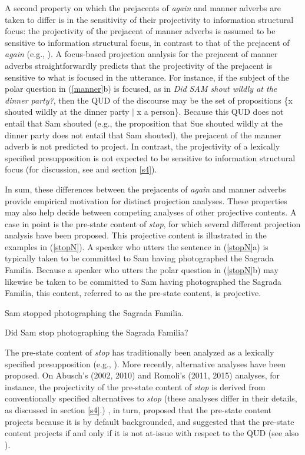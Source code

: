 \documentclass[a4paper,12pt]{article}
\newcommand{\6}{\mbox{$[\hspace*{-.6mm}[$}}
\newcommand{\9}{\mbox{$]\hspace*{-.6mm}]$}}
\begin{document}
A second property on which the prejacents of {\em again} and manner adverbs are taken to differ is in the sensitivity of their projectivity to information structural focus: the projectivity of the prejacent of manner adverbs is assumed to be sensitive to information structural focus, in contrast to that of the prejacent of {\em again} (e.g., \citealt{beck2006,abrusan2013,abrusan2013b}). A focus-based projection analysis for the prejacent of manner adverbs straightforwardly predicts that the projectivity of the prejacent is sensitive to what is focused in the utterance. For instance, if the subject of the polar question in (\ref{manner}b) is focused, as in {\em Did SAM shout wildly at the dinner party?}, then the QUD of the discourse may be the set of propositions \{x shouted wildly at the dinner party $|$ x a person\}. Because this QUD does not entail that Sam shouted (e.g., the proposition that Sue shouted wildly at the dinner party does not entail that Sam shouted), the prejacent of the manner adverb is not predicted to project. In contrast, the projectivity of a lexically specified presupposition is not expected to be sensitive to information structural focus (for discussion, see \citealt{djaerv-bacovcin-salt27} and section \ref{s4}).

In sum, these differences between the prejacents of {\em again} and manner adverbs provide empirical motivation for distinct projection analyses. These properties may  also help decide between competing analyses of other projective contents. A case in point is the pre-state content of {\em stop}, for which several different projection analysis have been proposed. This projective content is illustrated in the examples in (\ref{stopN}). A speaker who utters the sentence in (\ref{stopN}a) is typically taken to be committed to Sam having photographed the Sagrada Familia. Because a speaker who utters the polar question in (\ref{stopN}b) may likewise be taken to be committed to Sam having photographed the Sagrada Familia, this content, referred to as the pre-state content, is projective.

\begin{exe}
\ex\label{stopN}
\begin{xlist}
\ex Sam stopped photographing the Sagrada Familia.

\ex Did Sam stop photographing the Sagrada Familia?
\end{xlist}
\end{exe}
The pre-state content of {\em stop} has traditionally been analyzed as a lexically specified presupposition (e.g., \citealt{heim83,vds92,kadmon01}). More recently, alternative analyses have been proposed. On Abusch's (2002, 2010)  and Romoli's (2011, 2015) analyses, for instance, the projectivity of the pre-state content of {\em stop} is derived from conventionally specified alternatives to {\em stop} (these analyses differ in their details, as discussed in section \ref{s4}.)  \citet{abrusan2011,abrusan2016}, in turn, proposed that the pre-state content projects because it is by default backgrounded, and \citet*{brst-ar} suggested that the pre-state content projects if and only if it is not at-issue with respect to the QUD (see also \citealt*{brst-salt10,tbd-variability}). 
\end{document}
